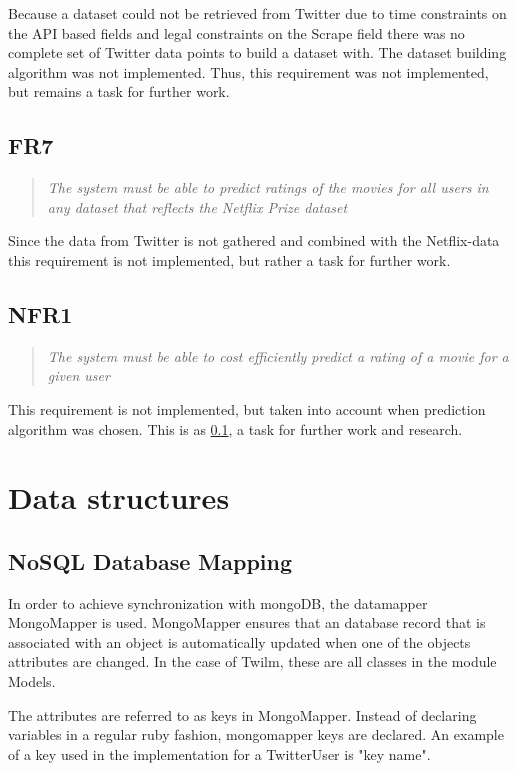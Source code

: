 Because a dataset could not be retrieved from Twitter due to time constraints on the API based fields and legal constraints on the Scrape field there was no complete set of Twitter data points to build a dataset with. The dataset building algorithm was not implemented. Thus, this requirement was not implemented, but remains a task for further work.

\subsection{FR7}\label{subsec:FR7}
\begin{quotation}
\em The system must be able to predict ratings of the movies for all users in any dataset that reflects the Netflix Prize dataset %
\end{quotation}

Since the data from Twitter is not gathered and combined with the Netflix-data this requirement is not implemented, but rather a task for further work.

\subsection{NFR1}
\begin{quotation}
\em The system must be able to cost efficiently predict a rating of a movie for a given user %
\end{quotation}

This requirement is not implemented, but taken into account when prediction algorithm was chosen. This is as \ref{subsec:FR7}, a task for further work and research.


\section{Data structures}\label{impl:Data structures}
\subsection{NoSQL Database Mapping}
In order to achieve synchronization with mongoDB, the datamapper MongoMapper is used. MongoMapper ensures that an database record that is associated with an object is automatically updated when one of the objects attributes are changed. In the case of Twilm, these are all classes in the module Models.

The attributes are referred to as keys in MongoMapper. Instead of declaring variables in a regular ruby fashion, mongomapper keys are declared. An example of a key used in the implementation for a TwitterUser is "key name".

